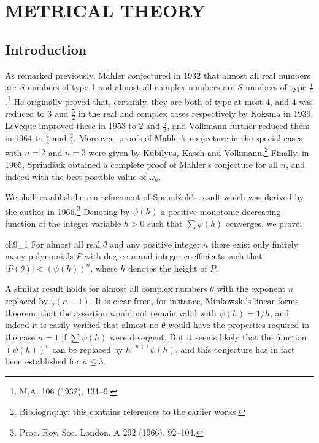 
\chapter{METRICAL THEORY}\label{ch:9}

\section{Introduction}\label{sec:ch9_1}

As remarked previously, Mahler conjectured in 1932 that almost all real numbers are $S$-numbers of type 1 and almost all complex numbers are $S$-numbers of type $\frac{1}{2}$.\footnote{M.A. 106 (1932), 131--9.} He originally proved that, certainly, they are both of type at most 4, and 4 was reduced to 3 and $\frac{5}{2}$ in the real and complex cases respectively by Koksma in 1939. LeVeque improved these in 1953 to 2 and $\frac{5}{3}$, and Volkmann further reduced them in 1964 to $\frac{4}{3}$ and $\frac{2}{3}$. Moreover, proofs of Mahler's conjecture in the special cases with $n=2$ and $n=3$ were given by Kubilyus, Kasch and Volkmann.\footnote{Bibliography; this contains references to the earlier works.} Finally, in 1965, Sprind\v{z}uk obtained a complete proof of Mahler's conjecture for all $n$, and indeed with the best possible value of $\omega_n$.

We shall establish here a refinement of Sprind\v{z}uk's result which was derived by the author in 1966.\footnote{Proc. Roy. Soc. London, A 292 (1966), 92--104.} Denoting by $\psi(h)$ a positive monotonic decreasing function of the integer variable $h>0$ such that $\sum \psi(h)$ converges, we prove:

\begin{mythm}{}{ch9_1}
For almost all real $\theta$ and any positive integer $n$ there exist only finitely many polynomials $P$ with degree $n$ and integer coefficients such that $|P(\theta)| < (\psi(h))^n$, where $h$ denotes the height of $P$.
\end{mythm}

A similar result holds for almost all complex numbers $\theta$ with the exponent $n$ replaced by $\frac{1}{2}(n-1)$. It is clear from, for instance, Minkowski's linear forms theorem, that the assertion would not remain valid with $\psi(h) = 1/h$, and indeed it is easily verified that almost no $\theta$ would have the properties required in the case $n = 1$ if $\sum \psi(h)$ were divergent. But it seems likely that the function $(\psi(h))^n$ can be replaced by $h^{-n+1}\psi(h)$, and this conjecture has in fact been established for $n \leq 3$.

